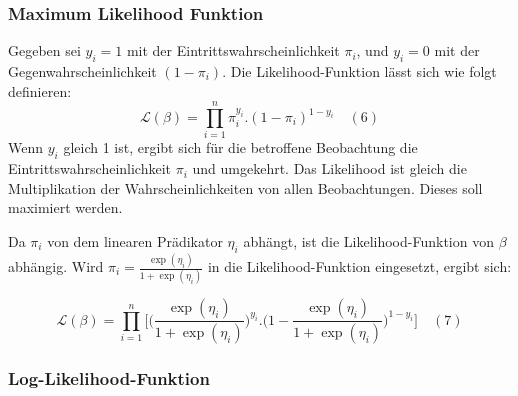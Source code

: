 \documentclass[12pt,]{article}
\begin{document}
\subsubsection{Maximum Likelihood
Funktion}\label{maximum-likelihood-funktion}

Gegeben sei \(y_i = 1\) mit der Eintrittswahrscheinlichkeit \(\pi_i\),
und \(y_i = 0\) mit der Gegenwahrscheinlichkeit \((1-\pi_i)\). Die
Likelihood-Funktion lässt sich wie folgt definieren: \[
\mathcal{L}(\beta) = {\prod_{i=1}^{n} \pi_i^{y_i}.(1-\pi_i)^{1-y_i}} \quad (6)
\] Wenn \(y_i\) gleich 1 ist, ergibt sich für die betroffene Beobachtung
die Eintrittswahrscheinlichkeit \(\pi_i\) und umgekehrt. Das Likelihood
ist gleich die Multiplikation der Wahrscheinlichkeiten von allen
Beobachtungen. Dieses soll maximiert werden.

Da \(\pi_i\) von dem linearen Prädikator \(\eta_i\) abhängt, ist die
Likelihood-Funktion von \(\beta\) abhängig. Wird
\(\pi_i = \frac{\exp(\eta_i)}{1 + \exp(\eta_i)}\) in die
Likelihood-Funktion eingesetzt, ergibt sich:

\[
\mathcal{L}(\beta) = {\prod_{i=1}^{n} \Bigg[ \Big( \frac{\exp(\eta_i)}{1 + \exp(\eta_i)} \Big)^{y_i}.\Big(1-\frac{\exp(\eta_i)}{1 + \exp(\eta_i)}\Big)^{1-y_i}}\Bigg] \quad (7)
\]

\subsubsection{Log-Likelihood-Funktion}\label{log-likelihood-funktion}
\end{document}
